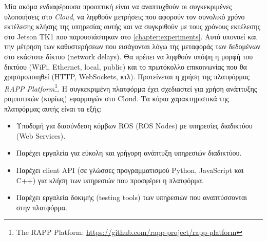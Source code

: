 Μία ακόμα ενδιαφέρουσα προοπτική είναι να αναπτυχθούν οι συγκεκριμένες υλοποιήσεις στο \emph{Cloud},
να ληφθούν μετρήσεις που αφορούν τον συνολικό χρόνο εκτέλεσης κλήσης
της υπηρεσίας αυτής και να συγκριθούν με τους χρόνους εκτέλεσης στο Jetson TK1
που παρουσιάστηκαν στο \autoref{chapter:experiments}.
Αυτό υπονοεί και την μέτρηση των καθυστερήσεων που εισάγονται λόγω της μεταφοράς
των δεδομένων στο εκάστοτε δίκτυο (network delays). Θα πρέπει να ληφθούν υπόψη
η μορφή του δικτύου (WiFi, Ethernet, local, public) και το πρωτόκολλο επικοινωνίας που θα χρησιμοποιηθεί (HTTP, WebSockets, κτλ).
Προτείνεται η χρήση της πλατφόρμας \emph{RAPP Platform}\footnote{The RAPP Platform: \url{https://github.com/rapp-project/rapp-platform}}.
Η συγκεκριμένη πλατφόρμα έχει σχεδιαστεί για χρήση ανάπτυξης ρομποτικών (κυρίως)
εφαρμογών στο Cloud. Τα κύρια χαρακτηριστικά της πλατφόρμας αυτής είναι τα εξής:
\begin{itemize}
  \item{Υποδομή για διασύνδεση κόμβων ROS (ROS Nodes) με υπηρεσίες διαδικτύου (Web Services).}
  \item{Παρέχει εργαλεία για εύκολη και γρήγορη ανάπτυξη υπηρεσιών διαδικτύου.}
  \item{Παρέχει client API (σε γλώσσες προγραμματισμού Python, JavaScript και C++) για κλήση των υπηρεσιών που προσφέρει η πλατφόρμα.}
  \item{Παρέχει εργαλεία δοκιμής (testing tools) των υπηρεσιών που αναπτύσσονται στην πλατφόρμα.}
\end{itemize}

